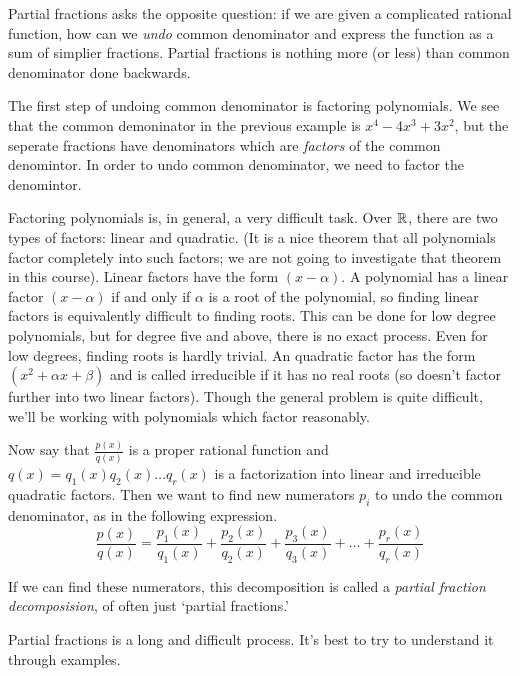 \documentclass[fleqn]{report}
\begin{document}
Partial fractions asks the opposite question: if we are given
a complicated rational function, how can we \emph{undo} common
denominator and express the function as a sum of simplier
fractions. Partial fractions is nothing more (or less) than
common denominator done backwards.

The first step of undoing common denominator is factoring
polynomials. We see that the common demoninator in the
previous example is $x^4 - 4x^3 + 3x^2$, but the seperate
fractions have denominators which are \emph{factors} of the
common denomintor. In order to undo common denominator, we
need to factor the denomintor.

Factoring polynomials is, in general, a very difficult task.
Over $\mathbb{R}$, there are two types of factors: linear and
quadratic. (It is a nice theorem that all polynomials factor
completely into such factors; we are not going to investigate
that theorem in this course). Linear factors have the form
$(x-\alpha)$. A polynomial has a linear factor $(x-\alpha)$
if and only if $\alpha$ is a root of the polynomial, so
finding linear factors is equivalently difficult to finding
roots. This can be done for low degree polynomials, but for
degree five and above, there is no exact process. Even for low
degrees, finding roots is hardly trivial. An quadratic factor
has the form $(x^2 + \alpha x + \beta)$ and is called
irreducible if it has no real roots (so doesn't factor further
into two linear factors). Though the general problem is quite
difficult, we'll be working with polynomials which factor
reasonably.

Now say that $\frac{p(x)}{q(x)}$ is a proper rational function
and $q(x) = q_1(x) q_2(x) \ldots q_r(x)$ is a factorization
into linear and irreducible quadratic factors. Then we want
to find new numerators $p_i$ to undo the common denominator,
as in the following expression.
\begin{equation*}
\frac{p(x)}{q(x)} = \frac{p_1(x)}{q_1(x)} + \frac{p_2(x)}{q_2(x)} + 
\frac{p_3(x)}{q_3(x)} + \ldots + \frac{p_r(x)}{q_r(x)} 
\end{equation*}

\begin{defn}
If we can find these numerators, this decomposition is called
a \emph{partial fraction decomposision}, of often just
`partial fractions.' 
\end{defn}

Partial fractions is a long and difficult process. It's best
to try to understand it through examples.
\end{document}
